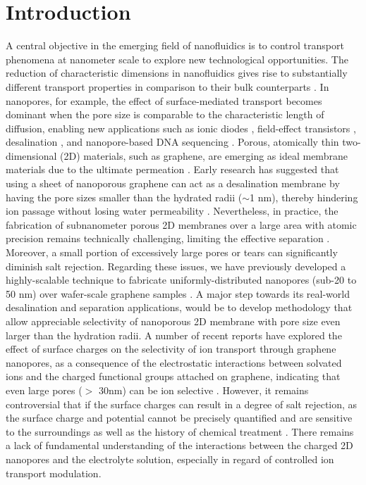 \documentclass[journal=langd5,email=true, hyperref=true, keywords=false]{achemso}
\begin{document}
\section*{Introduction}
\label{sec:intro}
A central objective in the emerging field of nanofluidics is to
control transport phenomena at nanometer scale to explore new
technological opportunities. The reduction of characteristic
dimensions in nanofluidics gives rise to substantially different
transport properties in comparison to their bulk counterparts
\cite{Schoch_2008}. In nanopores, for example, the effect of
surface-mediated transport becomes dominant when the pore size is
comparable to the characteristic length of diffusion, enabling new
applications such as ionic diodes \cite{Karnik_2007,siwy2002fabrication,vlassiouk2007nanofluidic}, field-effect
transistors \cite{Nam_2009}, desalination \cite{Heiranian_2015}, and
nanopore-based DNA sequencing \cite{Heerema_2016,Garaj_2013}. Porous,
atomically thin two-dimensional (2D) materials, such as graphene, are
emerging as ideal membrane materials due to the ultimate permeation
\cite{Suk_2010,Jiang_2009,Celebi_2014,Koenig_2012,Drahushuk_2012}. Early
research has suggested that using a sheet of nanoporous graphene can
act as a desalination membrane by having the pore sizes smaller than
the hydrated radii ($\sim$1 nm), thereby hindering ion passage without
losing water permeability
\cite{Cohen_Tanugi_2012,Suk_2014,Cohen_Tanugi_2014,Cohen_Tanugi_2015,O_Hern_2014,O_Hern_2015,Surwade_2015,Walker_2017,Ghosh_2018}. Nevertheless,
in practice, the fabrication of subnanometer porous 2D membranes over
a large area with atomic precision remains technically challenging, 
limiting the effective separation
\cite{Suk_2014,Rollings_2016,O_Hern_2012,Wang_2017}. Moreover, a small
portion of excessively large pores or tears can significantly diminish
salt rejection. Regarding these issues, we have previously developed a
highly-scalable technique to fabricate uniformly-distributed nanopores
(sub-20 to 50 nm) over wafer-scale graphene samples
\cite{Choi_2018}. A major step towards its real-world desalination and
separation applications, would be to develop methodology that allow
appreciable selectivity of nanoporous 2D membrane with pore size even
larger than the hydration radii. A number of recent reports have
explored the effect of surface charges on the selectivity of ion
transport through graphene nanopores, as a consequence of the
electrostatic interactions between solvated ions and the charged
functional groups attached on graphene, indicating that even large
pores ($>$ 30nm) can be ion selective
\cite{Rollings_2016,Surwade_2014}. However, it remains controversial
that if the surface charges can result in a degree of salt rejection,
as the surface charge and potential cannot be precisely quantified and
are sensitive to the surroundings as well as the history of chemical
treatment \cite{Li_2008}. There remains a lack of fundamental
understanding of the interactions between the charged 2D nanopores and
the electrolyte solution, { especially in regard of controlled ion
  transport modulation}.
\end{document}
